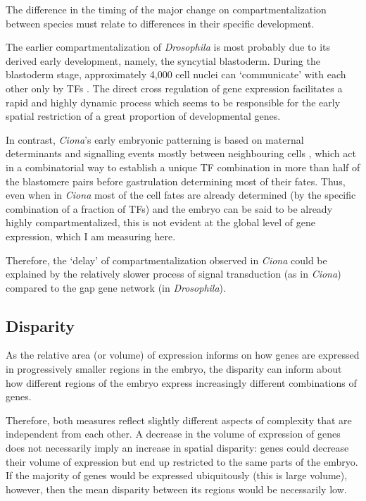 The difference in the timing of the major change on compartmentalization between species must relate to differences in their specific development.

The earlier compartmentalization of \textit{Drosophila} is most probably due to its derived early development, namely, the syncytial blastoderm. 
During the blastoderm stage, approximately 4,000 cell nuclei can `communicate' with each other only by TFs \citep{Jaeger2011}. The direct cross regulation of gene expression facilitates a rapid and highly dynamic process which seems to be responsible for the early spatial restriction of a great proportion of developmental genes.

In contrast,  \textit{Ciona}'s early embryonic patterning is based on maternal determinants and signalling events mostly between neighbouring cells \citep{Lemaire2009}, which act in a combinatorial way \citep{Hudson2007} to establish a unique TF combination in more than half of the blastomere pairs before gastrulation \citep{Imai2006} determining most of their fates.
Thus, even when in \textit{Ciona} most of the cell fates are already determined (by the specific combination of a fraction of TFs) and the embryo can be said to be already highly compartmentalized, this is not evident at the global level of gene expression, which I am measuring here.


Therefore, the `delay' of compartmentalization observed in \textit{Ciona} could be explained by the relatively slower process of signal transduction (as in \textit{Ciona}) compared to the gap gene network (in \textit{Drosophila}).

\subsection{Disparity}
As the relative area (or volume) of expression informs on how genes are expressed in progressively smaller regions in the embryo, the disparity can inform about how different regions of the embryo express increasingly different combinations of genes.

Therefore, both measures reflect slightly different aspects of complexity that are independent from each other. A decrease in the volume of expression of genes does not necessarily imply an increase in spatial disparity: genes could decrease their volume of expression but end up restricted to the same parts of the embryo. 
If the majority of genes would be expressed ubiquitously (this is large volume), however, then the mean disparity between its regions would be necessarily low. 

